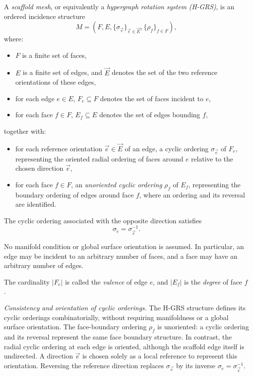 \documentclass[acmtog]{acmart}
\begin{document}
\begin{definition}
\label{def:HGRS}
A \emph{scaffold mesh}, or equivalently a \emph{hypergraph rotation system (H-GRS)}, is an ordered incidence structure
\[
M = (F, E, \{\sigma_{\vec{e}}\}_{\vec{e} \in \vec{E}}, \{\rho_f\}_{f \in F}),
\]
where:
\begin{itemize}
    \item $F$ is a finite set of faces,
    \item $E$ is a finite set of edges, and $\vec{E}$ denotes the set of the two reference orientations of these edges,
    \item for each edge $e \in E$, $F_e \subseteq F$ denotes the set of faces incident to $e$,
    \item for each face $f \in F$, $E_f \subseteq E$ denotes the set of edges bounding $f$,
\end{itemize}
together with:
\begin{itemize}
    \item for each reference orientation $\vec{e} \in \vec{E}$ of an edge, a cyclic ordering $\sigma_{\vec{e}}$ of $F_e$, representing the oriented radial ordering of faces around $e$ relative to the chosen direction $\vec{e}$,
    \item for each face $f \in F$, an \emph{unoriented cyclic ordering} $\rho_f$ of $E_f$, representing the boundary ordering of edges around face $f$, where an ordering and its reversal are identified.
\end{itemize}

The cyclic ordering associated with the opposite direction satisfies
\[
\sigma_{\overleftarrow{e}} = \sigma_{\vec{e}}^{-1}.
\]

No manifold condition or global surface orientation is assumed. In particular, an edge may be incident to an arbitrary number of faces, and a face may have an arbitrary number of edges.

The cardinality $|F_e|$ is called the \emph{valence} of edge $e$, and $|E_f|$ is the \emph{degree} of face $f$.
\end{definition}


\textit{Consistency and orientation of cyclic orderings.}
The H-GRS structure defines its cyclic orderings combinatorially, without requiring manifoldness or a global surface orientation. The face-boundary ordering $\rho_f$ is unoriented: a cyclic ordering and its reversal represent the same face boundary structure. In contrast, the radial cyclic ordering at each edge is oriented, although the scaffold edge itself is undirected. A direction $\vec{e}$ is chosen solely as a local reference to represent this orientation. Reversing the reference direction replaces $\sigma_{\vec{e}}$ by its inverse $\sigma_{\overleftarrow{e}}=\sigma_{\vec{e}}^{-1}$.
\end{document}

